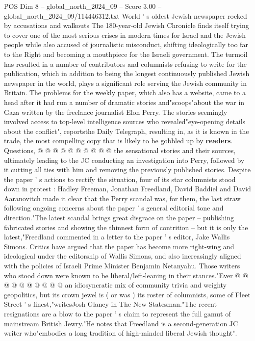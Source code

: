 \begin{textsample}{POS Dim 8 – global\_north\_2024\_09 – Score 3.00 – global\_north\_2024\_09/114446312.txt}  \label{ex:f8_pos_297}
World ' s oldest Jewish newspaper rocked by accusations and walkouts The 180-year-old Jewish Chronicle finds itself trying to cover one of the most serious crises in modern times for Israel and the Jewish people while also accused of journalistic misconduct, shifting ideologically too far to the Right and becoming a mouthpiece for the Israeli government.
The turmoil has resulted in a number of contributors and columnists refusing to write for the publication, which in addition to being the longest continuously published Jewish newspaper in the world, plays a significant role serving the Jewish community in Britain.
The problems for the weekly paper, which also has a website, came to a head after it had run a number of dramatic stories and"scoops"about the war in Gaza written by the freelance journalist Elon Perry.
The stories seemingly involved access to top-level intelligence sources who revealed"eye-opening details about the conflict", reportsthe Daily Telegraph, resulting in, as it is known in the trade, the most compelling copy that is likely to be gobbled up by \textbf{readers}.
Questions, @ @ @ @ @ @ @ @ @ @ the sensational stories and their sources, ultimately leading to the JC conducting an investigation into Perry, followed by it cutting all ties with him and removing the previously published stories.
Despite the paper ' s actions to rectify the situation, four of its star columnists stood down in protest : Hadley Freeman, Jonathan Freedland, David Baddiel and David Aaranovitch made it clear that the Perry scandal was, for them, the last straw following ongoing concerns about the paper ' s general editorial tone and direction."The latest scandal brings great disgrace on the paper -- publishing fabricated stories and showing the thinnest form of contrition -- but it is only the latest,"Freedland commented in a letter to the paper ' s editor, Jake Wallis Simons.
Critics have argued that the paper has become more right-wing and ideological under the editorship of Wallis Simons, and also increasingly aligned with the policies of Israeli Prime Minister Benjamin Netanyahu.
Those writers who stood down were known to be liberal/left-leaning in their stances."Ever @ @ @ @ @ @ @ @ @ @ an idiosyncratic mix of community trivia and weighty geopolitics, but its crown jewel is ( or was ) its roster of columnists, some of Fleet Street ' s finest,"writesJosh Glancy in The New Statesman."The recent resignations are a blow to the paper ' s claim to represent the full gamut of mainstream British Jewry."He notes that Freedland is a second-generation JC writer who"embodies a long tradition of high-minded liberal Jewish thought".

\end{textsample}
